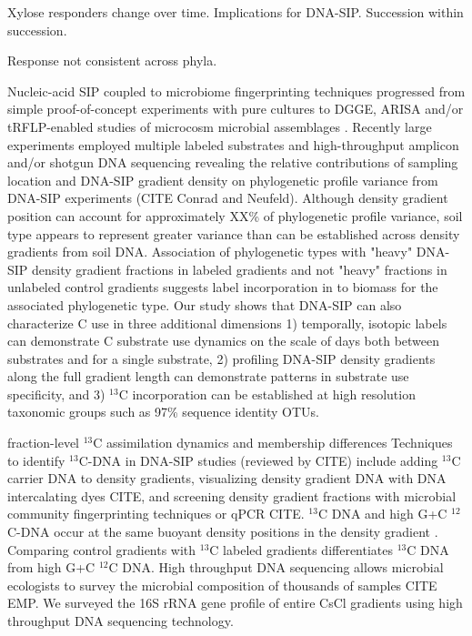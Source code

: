 Xylose responders change over time. Implications for DNA-SIP. Succession within
succession.

Response not consistent across phyla.

Nucleic-acid SIP coupled to microbiome fingerprinting techniques progressed
from simple proof-of-concept experiments with pure cultures
\citep{radajewski2000stable} to DGGE, ARISA and/or tRFLP-enabled studies of
microcosm microbial assemblages \citep{Haichar_2007}. Recently large
experiments employed multiple labeled substrates and high-throughput amplicon
and/or shotgun DNA sequencing \citep{Verastegui_2014} revealing the relative
contributions of sampling location and DNA-SIP gradient density on phylogenetic
profile variance from DNA-SIP experiments (CITE Conrad and Neufeld). Although
density gradient position can account for approximately XX\% of phylogenetic
profile variance, soil type appears to represent greater variance than can be
established across density gradients from soil DNA. Association of phylogenetic
types with "heavy" DNA-SIP density gradient fractions in labeled gradients and
not "heavy" fractions in unlabeled control gradients suggests label
incorporation in to biomass for the associated phylogenetic type. Our study
shows that DNA-SIP can also characterize C use in three additional 
dimensions 1) temporally, isotopic labels can demonstrate C substrate use
dynamics on the scale of days both between substrates and for a single
substrate, 2) profiling DNA-SIP density gradients along the full gradient
length can demonstrate patterns in substrate use specificity, and 3) $^{13}$C
incorporation can be established at high resolution taxonomic groups such
as 97\% sequence identity OTUs.

fraction-level $^{13}$C assimilation dynamics and membership differences
Techniques to identify $^{13}$C-DNA in DNA-SIP studies (reviewed by CITE)
include adding $^{13}$C carrier DNA to density gradients, visualizing
density gradient DNA with DNA intercalating dyes CITE, and screening
density gradient fractions with microbial community fingerprinting
techniques or qPCR CITE. $^{13}$C DNA and high G+C $^{12}$C-DNA occur at
the same buoyant density positions in the density gradient
\citep{Buckley_2007}. Comparing control gradients with $^{13}$C labeled
gradients differentiates $^{13}$C DNA from high G+C $^{12}$C DNA. High
throughput DNA sequencing allows microbial ecologists to survey the
microbial composition of thousands of samples CITE EMP. We surveyed the
16S rRNA gene profile of entire CsCl gradients using high throughput DNA
sequencing technology.

